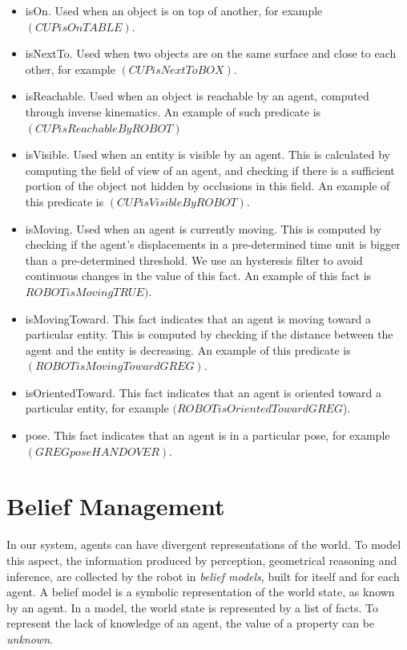 \begin{itemize}
\item isOn. Used when an object is on top of another, for example $(CUP isOn TABLE)$.
\item isNextTo. Used when two objects are on the same surface and close to each other, for example $(CUP isNextTo BOX)$.
\item isReachable. Used when an object is reachable by an agent, computed through inverse kinematics. An example of such predicate is $(CUP isReachableBy ROBOT)$
\item isVisible. Used when an entity is visible by an agent. This is calculated by computing the field of view of an agent, and checking if there is a sufficient portion of the object not hidden by occlusions in this field. An example of this predicate is $(CUP isVisibleBy ROBOT)$.
\item isMoving. Used when an agent is currently moving. This is computed by checking if the agent's displacements in a pre-determined time unit is bigger than a pre-determined threshold. We use an hysteresis filter to avoid continuous changes in the value of this fact. An example of this fact is $ROBOT isMoving TRUE)$.
\item isMovingToward. This fact indicates that an agent is moving toward a particular entity. This is computed by checking if the distance between the agent and the entity is decreasing. An example of this predicate is $(ROBOT isMovingToward GREG)$.
\item isOrientedToward. This fact indicates that an agent is oriented toward a particular entity, for example $(ROBOT isOrientedToward GREG$).
\item pose. This fact indicates that an agent is in a particular pose, for example $(GREG pose HANDOVER)$.
\end{itemize}


\section{Belief Management}
\label{sec:situation_assessment-belief_management}
In our system, agents can have divergent representations of the world. To model this aspect, the information produced by perception, geometrical reasoning and inference, are collected by the robot in \textit{belief models}, built for itself and for each agent. A belief model is a symbolic representation of the world state, as known by an agent. In a model, the world state is represented by a list of facts. To represent the lack of knowledge of an agent, the value of a property can be \textit{unknown}.

